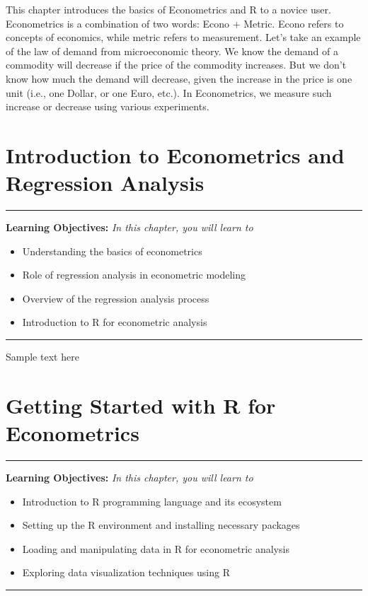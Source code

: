 \documentclass[
  letterpaper,
  twoside,
  openany]{scrbook}
\providecommand{\abstractname}{Learning Objectives} %
\newenvironment{objectives}[1]{%
	\hrule
	\vspace{5pt}
	\small\textbf{\abstractname: } 
	\newline
	\vspace{0.1cm}
	\small\emph{#1} %
	\itshape %
}{%
	\vspace{5pt}
	\hrule
	\vspace{0.6cm}
}
\begin{document}
This chapter introduces the basics of Econometrics and R to a novice
user. Econometrics is a combination of two words: Econo + Metric. Econo
refers to concepts of economics, while metric refers to measurement.
Let's take an example of the law of demand from microeconomic theory. We
know the demand of a commodity will decrease if the price of the
commodity increases. But we don't know how much the demand will
decrease, given the increase in the price is one unit (i.e., one Dollar,
or one Euro, etc.). In Econometrics, we measure such increase or
decrease using various experiments.

\hypertarget{introduction-to-econometrics-and-regression-analysis}{%
\chapter{Introduction to Econometrics and Regression
Analysis}\label{introduction-to-econometrics-and-regression-analysis}}

\begin{objectives}{In this chapter, you will learn to}
\begin{itemize}

\item{Understanding the basics of econometrics}

\item{Role of regression analysis in econometric modeling}

\item{Overview of the regression analysis process}

\item{Introduction to R for econometric analysis}

\end{itemize}

\end{objectives}

Sample text here

\hypertarget{getting-started-with-r-for-econometrics}{%
\chapter{Getting Started with R for
Econometrics}\label{getting-started-with-r-for-econometrics}}

\begin{objectives}{In this chapter, you will learn to}
\begin{itemize}

\item{Introduction to R programming language and its ecosystem}

\item{Setting up the R environment and installing necessary packages}

\item{Loading and manipulating data in R for econometric analysis}

\item{Exploring data visualization techniques using R}

\end{itemize}

\end{objectives}
\end{document}

